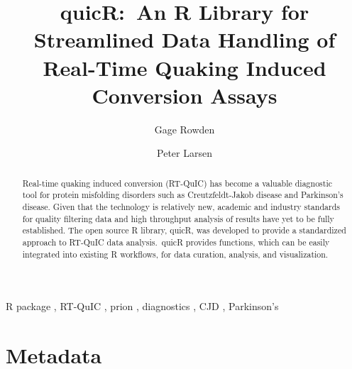 \documentclass[preprint,12pt,a4paper]{elsarticle}
\begin{document}
    \renewcommand{\labelenumii}{\arabic{enumi}.\arabic{enumii}}

    \begin{frontmatter}

        \title{quicR:\ An R Library for Streamlined Data Handling of Real-Time Quaking Induced Conversion Assays}
        \author[label1,label2,label3]{Gage Rowden}
        \author[label1,label2,label3]{Peter Larsen}
        \address[label1]{Department of Veterinary and Biomedical Sciences, University of Minnesota, USA.}
        \address[label2]{Minnesota Center for Prion Research and Outreach, University of Minnesota, USA.}
        \address[label3]{Priogen Corp., USA.}

        \begin{abstract}
            Real-time quaking induced conversion (RT-QuIC) has become a valuable diagnostic tool for protein misfolding disorders such as Creutzfeldt-Jakob disease and Parkinson's disease. Given that the technology is relatively new, academic and industry standards for quality filtering data and high throughput analysis of results have yet to be fully established. The open source R library, quicR, was developed to provide a standardized approach to RT-QuIC data analysis.\ quicR provides functions, which can be easily integrated into existing R workflows, for data curation, analysis, and visualization.
        \end{abstract}

        \begin{keyword}
            R package \sep{} RT-QuIC \sep{} prion \sep{} diagnostics \sep{} CJD \sep{} Parkinson's
        \end{keyword}

    \end{frontmatter}


    \section*{Metadata}
\end{document}
